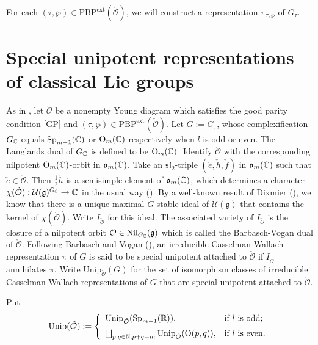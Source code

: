 \documentclass[lang = american]{ems-icm} %
\newcommand{\R}{\mathbb R}
\def\Sp{{\mathrm{Sp}}}
\newcommand{\Unip}{\operatorname{Unip}}
\newcommand{\Nil}{\operatorname{Nil}}
\newcommand{\g}{\mathfrak g}
\newcommand{\oO}{\operatorname{O}}
\newcommand{\CO}{{\mathcal {O}}}
\newcommand{\BN}{{\mathbb {N}}}
\numberwithin{equation}{section}
\theoremstyle{remark}
\begin{document}
For each $(\tau, \wp)\in  \mathrm{PBP}^{\mathrm{ext}}(\check \CO)$, we will construct a representation $\pi_{\tau,\wp}$ of $G_\tau$.


\section{Special unipotent representations of classical Lie groups}\label{sec5}


As in , let $\check \CO$ be a nonempty Young diagram which satisfies the good parity condition \eqref{GP} and $(\tau, \wp)\in  \mathrm{PBP}^{\mathrm{ext}}(\check \CO)$. Let $G:=G_\tau$, whose complexification $G_{\mathbb{C}}$ equals $\Sp_{m-1}(\C)$ or $\oO_{m}(\C)$ respectively when $l$ is odd or even. The Langlands dual of $G_{\mathbb{C}}$ is defined to be $\oO_m(\C)$.
Identify  $\check \CO$ with the corresponding nilpotent $\oO_m(\C)$-orbit in $\mathfrak o_m(\mathbb{C})$.  Take an $\mathfrak{sl}_2$-triple $(\check e, \check h, \check f)$ in $\mathfrak o_m(\mathbb{C})$ such that $\check e\in \check \CO$. Then $\frac{1}{2} \check h$ is a semisimple element of $\mathfrak o_m(\mathbb{C})$, which determines a character $\chi(\check \CO): \mathcal U(\g)^{G_\C}\rightarrow \C$ in the  usual way (\cites{ArUni,BV}).
By a well-known result of Dixmier (\cite[Section 3]{Bor}), we know that there is a unique maximal $G$-stable ideal of $\mathcal U(\g)$ that contains the kernel of $\chi(\check \CO)$. Write $I_{\check \CO}$ for this ideal. The associated variety of $I_{\check \CO}$ is the closure of a nilpotent orbit $\CO \in \Nil_{G_{\C}}(\g)$ which is called the Barbasch-Vogan dual of $\check \CO$.
Following Barbasch and Vogan (\cites{ABV,BV}), an irreducible Casselman-Wallach representation $\pi$ of $G$  is said to be special unipotent attached to $\check \CO$ if
 $I_{\check \CO}$ annihilates $\pi$.  Write  $\mathrm{Unip}_{\check \CO}(G)$ for the set of isomorphism classes of irreducible Casselman-Wallach representations of $G$ that are special unipotent attached to $\check \CO$.


Put
\begin{equation*}\label{def:unipGc}
  \mathrm{Unip}(\check \CO):=\left\{
     \begin{array}{ll}
           \Unip_{\check \CO}(\Sp_{m-1}(\R)), &\text{if $l$ is odd}; \medskip\\
           \bigsqcup_{p,q\in \BN, p+q=m} \Unip_{\check \CO}(\oO(p,q)), &\text{if $l$ is even}.\\
           \end{array}
   \right.
\end{equation*}
\end{document}
